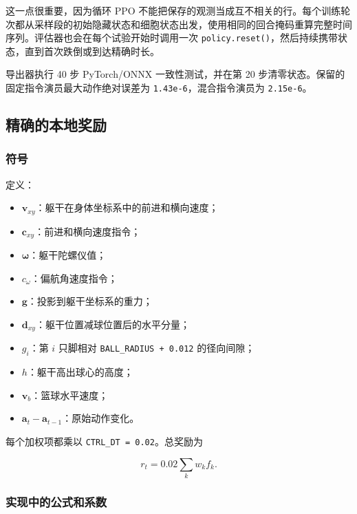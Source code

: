 \documentclass[
  chinese,
  11pt,
  letterpaper,
]{article}
\providecommand{\tightlist}{%
  \setlength{\itemsep}{0pt}\setlength{\parskip}{0pt}}
\begin{document}
这一点很重要，因为循环 PPO
不能把保存的观测当成互不相关的行。每个训练轮次都从采样段的初始隐藏状态和细胞状态出发，使用相同的回合掩码重算完整时间序列。评估器也会在每个试验开始时调用一次
\texttt{policy.reset()}，然后持续携带状态，直到首次跌倒或到达精确时长。

导出器执行 40 步 PyTorch/ONNX 一致性测试，并在第 20
步清零状态。保留的固定指令演员最大动作绝对误差为
\texttt{1.43e-6}，混合指令演员为 \texttt{2.15e-6}。

\subsection{精确的本地奖励}\label{ux7cbeux786eux7684ux672cux5730ux5956ux52b1}

\subsubsection{符号}\label{ux7b26ux53f7}

定义：

\begin{itemize}
\tightlist
\item
  \(\mathbf v_{xy}\)：躯干在身体坐标系中的前进和横向速度；
\item
  \(\mathbf c_{xy}\)：前进和横向速度指令；
\item
  \(\boldsymbol\omega\)：躯干陀螺仪值；
\item
  \(c_\omega\)：偏航角速度指令；
\item
  \(\mathbf g\)：投影到躯干坐标系的重力；
\item
  \(\mathbf d_{xy}\)：躯干位置减球位置后的水平分量；
\item
  \(g_i\)：第 \(i\) 只脚相对 \texttt{BALL\_RADIUS\ +\ 0.012}
  的径向间隙；
\item
  \(h\)：躯干高出球心的高度；
\item
  \(\mathbf v_b\)：篮球水平速度；
\item
  \(\mathbf a_t-\mathbf a_{t-1}\)：原始动作变化。
\end{itemize}

每个加权项都乘以 \texttt{CTRL\_DT\ =\ 0.02}。总奖励为

\[
r_t=0.02\sum_k w_k f_k.
\]

\subsubsection{实现中的公式和系数}\label{ux5b9eux73b0ux4e2dux7684ux516cux5f0fux548cux7cfbux6570}
\end{document}
